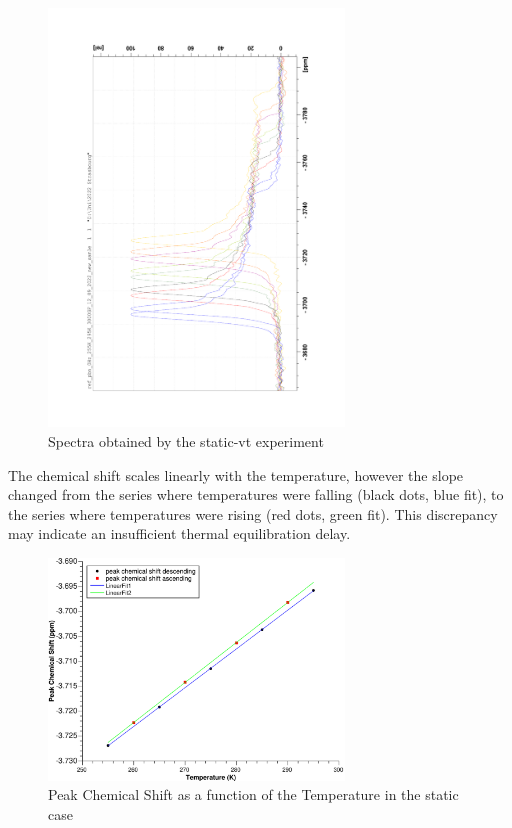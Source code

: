 \documentclass[12pt]{article}
\begin{document}
\begin{figure}[!ht]
    \centering
    \includegraphics[width=0.7\textwidth,angle=-90]{207Pb/Static_VT_Linera_Multi_Spectra.pdf}
    \caption{Spectra obtained by the static-vt experiment}
    \label{fig:Static_VT_Linera_Multi_Spectra}
\end{figure}
\FloatBarrier

The chemical shift scales linearly with the temperature, however the slope changed from the series where temperatures were falling (black dots, blue fit), to the series where temperatures were rising (red dots, green fit). This discrepancy may indicate an insufficient thermal equilibration delay.

\begin{figure}[!ht]
    \centering
    \includegraphics[width=0.7\textwidth]{207Pb/Static_VT_Linear.pdf}
    \caption{Peak Chemical Shift as a function of the Temperature in the static case}
    \label{fig:Static_VT_Linear}
\end{figure}
\end{document}
